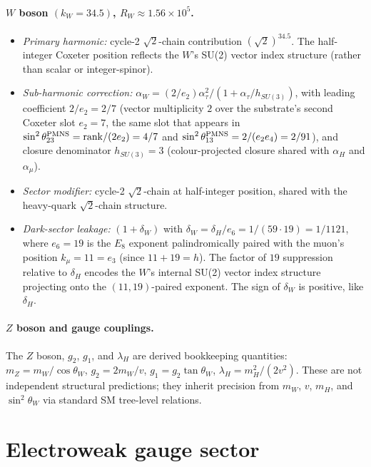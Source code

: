 ﻿\documentclass[reprint,amsmath,amssymb,aps,prd,longbibliography,floatfix]{revtex4-2}
\begin{document}
\paragraph{$W$ boson $(k_W = 34.5)$, $R_W \approx 1.56 \times 10^5$.}
\begin{itemize}
\item \emph{Primary harmonic:} cycle-2 $\sqrt{2}$-chain contribution
$(\sqrt{2})^{34.5}$. The half-integer Coxeter position reflects the
$W$'s SU(2) vector index structure (rather than scalar or
integer-spinor).
\item \emph{Sub-harmonic correction:} $\alpha_W = (2/e_2) \alpha_\tau^2 / (1 + \alpha_\tau / h_{SU(3)})$, with leading coefficient $2/e_2 = 2/7$ (vector multiplicity $2$ over the substrate's second Coxeter slot $e_2 = 7$, the same slot that appears in $\sin^2\theta_{23}^{\rm PMNS} = \mathrm{rank}/(2 e_2) = 4/7$ and $\sin^2\theta_{13}^{\rm PMNS} = 2/(e_2 e_4) = 2/91$), and closure denominator $h_{SU(3)} = 3$ (colour-projected closure shared with $\alpha_H$ and $\alpha_\mu$).
\item \emph{Sector modifier:} cycle-2 $\sqrt{2}$-chain at half-integer
position, shared with the heavy-quark $\sqrt{2}$-chain structure.
\item \emph{Dark-sector leakage:} $(1 + \delta_W)$ with
$\delta_W = \delta_H/e_6 = 1/(59 \cdot 19) = 1/1121$, where $e_6 = 19$
is the $E_8$ exponent palindromically paired with the muon's
position $k_\mu = 11 = e_3$ (since $11 + 19 = h$). The factor of $19$ suppression
relative to $\delta_H$ encodes the $W$'s internal SU(2) vector
index structure projecting onto the $(11, 19)$-paired exponent. The
sign of $\delta_W$ is positive, like $\delta_H$.
\end{itemize}

\paragraph{$Z$ boson and gauge couplings.}
The $Z$ boson, $g_2$, $g_1$, and $\lambda_H$ are derived bookkeeping
quantities: $m_Z = m_W/\cos\theta_W$, $g_2 = 2 m_W/v$,
$g_1 = g_2 \tan\theta_W$, $\lambda_H = m_H^2/(2v^2)$. These are not
independent structural predictions; they inherit precision from
$m_W$, $v$, $m_H$, and $\sin^2\theta_W$ via standard SM tree-level
relations.

\section{Electroweak gauge sector}
\label{sec:EW}
\end{document}
